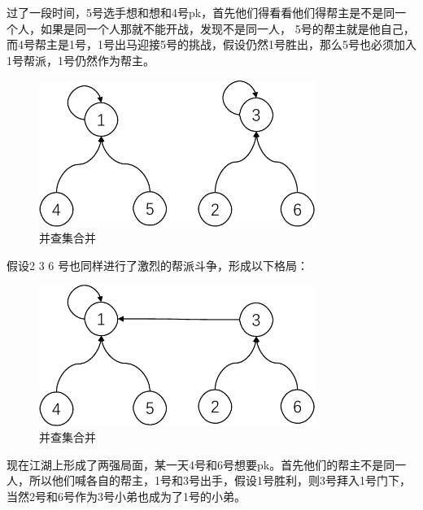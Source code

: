 \documentclass[lang=cn,newtx,10pt,scheme=chinese]{../elegantbook}
\begin{document}
过了一段时间，5号选手想和想和4号pk，首先他们得看看他们得帮主是不是同一个人，如果是同一个人那就不能开战，发现不是同一人，
5号的帮主就是他自己，而4号帮主是1号，1号出马迎接5号的挑战，假设仍然1号胜出，那么5号也必须加入1号帮派，1号仍然作为帮主。

\begin{figure}[h!]
  \centering
  \includegraphics[width=0.8\textwidth]{./figure/pdf/cropped/unionFindExample(c).pdf}
  \caption{并查集合并}
  \label{fig:unionFind3}
\end{figure}

假设2 3 6 号也同样进行了激烈的帮派斗争，形成以下格局：

\begin{figure}[h!]
  \centering
  \includegraphics[width=0.8\textwidth]{./figure/pdf/cropped/unionFindExample(d).pdf}
  \caption{并查集合并}
  \label{fig:unionFind4}
\end{figure}

现在江湖上形成了两强局面，某一天4号和6号想要pk。首先他们的帮主不是同一人，所以他们喊各自的帮主，1号和3号出手，假设1号胜利，则3号拜入1号门下，当然2号和6号作为3号小弟也成为了1号的小弟。
\end{document}
